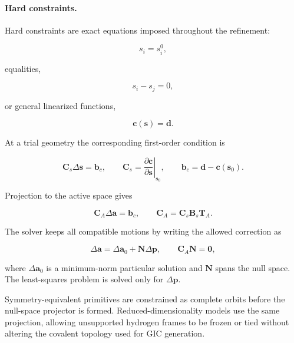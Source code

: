 \documentclass[aip,jcp,reprint,longbibliography,floatfix]{revtex4-2}
\begin{document}
\paragraph{Hard constraints.}

Hard constraints are exact equations imposed throughout the refinement:

\begin{equation}
s_i=s_i^{0},
\end{equation}

equalities,

\begin{equation}
s_i-s_j=0,
\end{equation}

or general linearized functions,

\begin{equation}
\mathbf{c}(\mathbf{s})=\mathbf{d}.
\end{equation}

At a trial geometry the corresponding first-order condition is

\begin{equation}
\mathbf{C}_s
\Delta\mathbf{s}
=
\mathbf{b}_c,
\qquad
\mathbf{C}_s =
\left.
\frac{\partial\mathbf{c}}
{\partial\mathbf{s}}
\right|_{\mathbf{s}_0},
\qquad
\mathbf{b}_c=\mathbf{d}-\mathbf{c}(\mathbf{s}_0).
\end{equation}

Projection to the active space gives

\begin{equation}
\mathbf{C}_{A}
\Delta\mathbf{a}
=
\mathbf{b}_c,
\qquad
\mathbf{C}_{A}
=
\mathbf{C}_s
\mathbf{B}_s
\mathbf{T}_{A}.
\end{equation}

The solver keeps all compatible motions by writing the allowed correction as

\begin{equation}
\Delta\mathbf{a}
=
\Delta\mathbf{a}_0
+
\mathbf{N}\Delta\mathbf{p},
\qquad
\mathbf{C}_{A}\mathbf{N}=\mathbf{0},
\end{equation}

where $\Delta\mathbf{a}_0$ is a minimum-norm particular solution and
$\mathbf{N}$ spans the null space. The least-squares problem is solved only
for $\Delta\mathbf{p}$.

Symmetry-equivalent primitives are constrained as complete orbits before the
null-space projector is formed. Reduced-dimensionality models use the same projection,
allowing unsupported hydrogen frames to be frozen or tied without altering the covalent topology
used for GIC generation.
\end{document}
